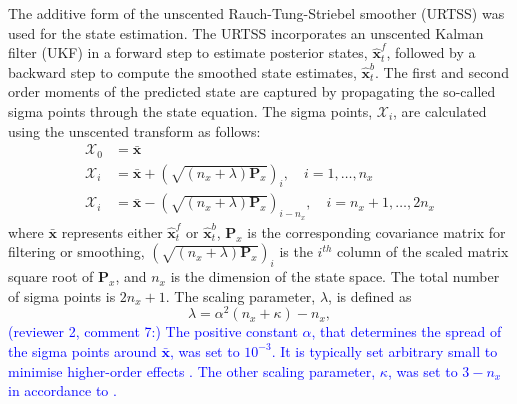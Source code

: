 \documentclass[review,authoryear,3p]{elsarticle}
\newcommand{\parham}[1]{\textcolor{blue}{#1}}
\begin{document}
The additive form of the unscented Rauch-Tung-Striebel smoother (URTSS) \citep{Sarkka2010} was used for the state estimation. The URTSS incorporates an unscented Kalman filter (UKF) \citep{Julier1997, Merwe2003} in a forward step to estimate posterior states, $\hat{\mathbf x}_t^{f}$, followed by a backward step to compute the smoothed state estimates, $\hat{\mathbf x}_t^{b}$. The first and second order moments of the predicted state are captured by propagating the so-called sigma points through the state equation. The sigma points, $\mathcal X_i$, are calculated using the unscented transform as follows:
\begin{align}\label{eq:sigmapoints1}
	\mathcal X_{0}&=\mathbf{\bar x} \\
	\mathcal X_{i}&= \mathbf{\bar x}+\left(\sqrt{( n_x + \lambda)\mathbf P_x}\right)_i, \quad i=1, \dots, n_x \\
	\mathcal X_{i}&=\mathbf{\bar x}-\left(\sqrt{( n_x + \lambda)\mathbf P_x}\right)_{i- n_x}, \quad i= n_x+1, \dots, 2n_x 
\end{align}
where $\mathbf{\bar x}$ represents either $\hat{\mathbf x}_t^{f}$ or $\hat{\mathbf x}_t^{b}$, $\mathbf{P}_x$ is the corresponding covariance matrix for filtering or smoothing, $\left(\sqrt{( n_x + \lambda)\mathbf P_x}\right)_i$ is the $i^{th}$ column of the scaled matrix square root of $\mathbf P_x$, and $n_x$ is the dimension of the state space. The total number of sigma points is $2n_x+1$. The scaling parameter, $\lambda$, is defined as 
\begin{equation}\label{eq:sigmapoints3}
	\lambda=\alpha^2( n_x+\kappa) - n_x, 
\end{equation}
\parham{(reviewer 2, comment 7:) The positive constant $\alpha$, that determines the spread of the sigma points around $\mathbf{\bar x}$, was set to $10^{-3}$. It is typically set arbitrary small to minimise higher-order effects \citep{Haykin2001}. The other scaling parameter, $\kappa$, was set to $3-n_x$ in accordance to \citet{Julier2002a}.}
\end{document}
